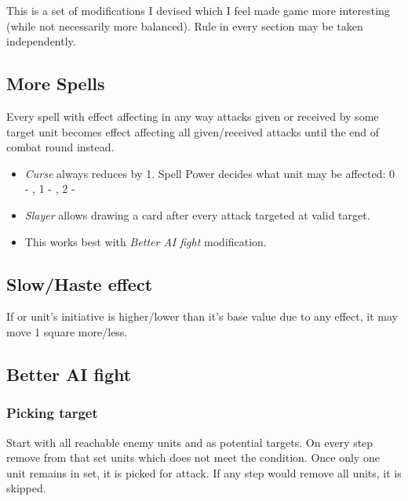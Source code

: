 \begin{multicols*}{2}
    
    This is a set of modifications I devised which I feel made game more interesting (while not necessarily more balanced). Rule in every section may be taken independently.
    
    \subsection*{More  Spells}
    
    Every spell with  effect affecting in any way attacks given or received by some target unit becomes  effect affecting all given/received attacks until the end of combat round instead.
    
    \begin{itemize}
        \item \emph{Curse} always reduces  by 1. Spell Power decides what unit may be affected: 0 - \bronze, 1 - \bronze \silver, 2 - \bronze \silver \golden
        \item \emph{Slayer} allows drawing a card after every attack targeted at valid  target.
        \item This works best with \textit{Better AI fight} modification.
    \end{itemize}
    
    \subsection*{Slow/Haste effect}
    
    If  or  unit's initiative is higher/lower than it's base value due to any effect, it may move 1 square more/less.
    
    \subsection*{Better AI fight}
    
    \subsubsection*{Picking target}
    
    Start with all reachable enemy units and as potential targets. On every step remove from that set units which does not meet the condition. Once only one unit remains in set, it is picked for attack. If any step would remove all units, it is skipped.
    

\end{multicols*}
